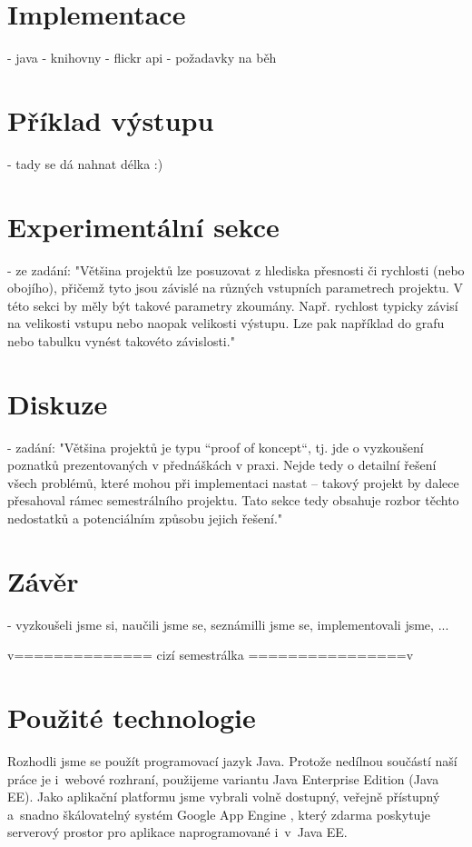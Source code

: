 \documentclass[12pt,oneside,a4paper]{article}
\begin{document}
\section{Implementace}
- java
- knihovny
- flickr api
- požadavky na běh


\section{Příklad výstupu}
- tady se dá nahnat délka :)

\section{Experimentální sekce}
- ze zadání: "Většina projektů lze posuzovat z hlediska přesnosti či rychlosti (nebo obojího),
přičemž tyto jsou závislé na různých vstupních parametrech projektu. V této sekci by
měly být takové parametry zkoumány. Např. rychlost typicky závisí na velikosti
vstupu nebo naopak velikosti výstupu. Lze pak například do grafu nebo tabulku
vynést takovéto závislosti."

\section{Diskuze}
- zadání: "Většina projektů je typu “proof of koncept“, tj. jde o vyzkoušení poznatků
prezentovaných v přednáškách v praxi. Nejde tedy o detailní řešení všech problémů,
které mohou při implementaci nastat – takový projekt by dalece přesahoval rámec
semestrálního projektu. Tato sekce tedy obsahuje rozbor těchto nedostatků a
potenciálním způsobu jejich řešení."

\section{Závěr}
- vyzkoušeli jsme si, naučili jsme se, seznámilli jsme se, implementovali jsme, ...

v============== cizí semestrálka ================v

\section{Použité technologie}

Rozhodli jsme se použít programovací jazyk Java. Protože nedílnou součástí naší práce je i~webové rozhraní, použijeme variantu Java Enterprise Edition (Java EE). Jako aplikační platformu jsme vybrali volně dostupný, veřejně přístupný a~snadno škálovatelný systém Google App Engine \cite{GoogleAE}, který zdarma poskytuje serverový prostor pro aplikace naprogramované i~v~Java EE.
\end{document}
